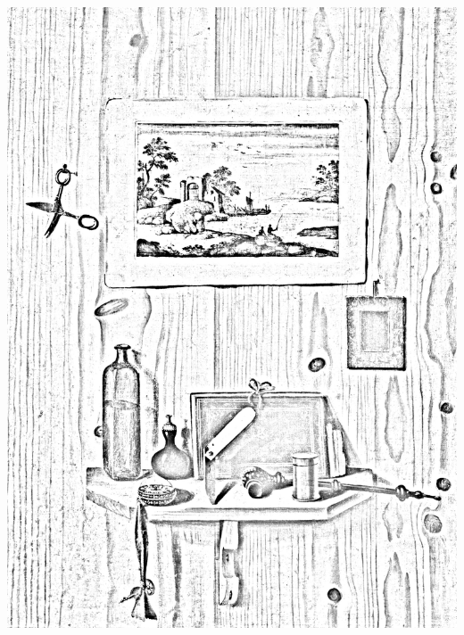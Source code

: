\documentclass[hidelinks,12pt,a4paper]{article}
\begin{document}
\begin{adjustwidth}{-30mm}{-30mm}
			\thispagestyle{empty}
			\begin{minipage}{0.93\linewidth}
				\centering
				\includegraphics[scale=0.2]{Gianlisi_Antonio_Junior-Trompe_l_oeil_con_paesaggio_forbici_e_mensola_con_oggetti.jpg}
			\end{minipage}
			
			\vspace*{\fill}
			\newpage
			

\end{adjustwidth}
\end{document}

